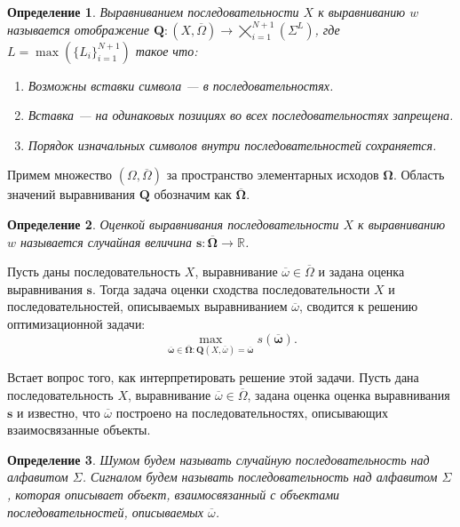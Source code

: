 \documentclass[specialist,
substylefile = spbu_report.rtx,
subf,href,colorlinks=true, 12pt]{disser}
\newtheorem{defenition}{Определение}
\begin{document}
		\begin{defenition}
			Выравниванием последовательности $X$ к выравниванию $w$ называется отображение $\boldsymbol{Q}: (X, \overline{\Omega}) \rightarrow \bigtimes_{i=1}^{N+1}(\Sigma^{L})$, где $L = \max(\{L_i\}_{i=1}^{N+1})$ такое что:
			\begin{enumerate}
				\item Возможны вставки символа --- в последовательностях.
				\item Вставка --- на одинаковых позициях во всех последовательностях запрещена.
				\item Порядок изначальных символов внутри последовательностей сохраняется.
			\end{enumerate}
		\end{defenition}
		
		Примем множество $(\Omega, \overline \Omega)$ за пространство элементарных исходов $\boldsymbol{\Omega}$. Область значений выравнивания $\boldsymbol Q$ обозначим как $\overline{\boldsymbol{\Omega}}$.
		
		\begin{defenition}				
			Оценкой выравнивания последовательности $X$ к выравниванию $w$ называется случайная величина $\boldsymbol s:\overline{\boldsymbol{\Omega}} \rightarrow \mathbb{R}$.
		\end{defenition}
	
		Пусть даны последовательность $X$, выравнивание $\overline{\omega} \in \overline{\Omega}$ и задана оценка выравнивания $\boldsymbol{s}$. Тогда задача оценки сходства последовательности $X$ и последовательностей, описываемых выравниванием $\overline{\omega}$, сводится к решению оптимизационной задачи:		
		\begin{equation*}
			\max_{\overline{\boldsymbol{\omega}} \in \overline{\boldsymbol{\Omega}} : \boldsymbol{Q}(X, \overline{\omega}) = \overline{\boldsymbol{\omega}}}s(\overline{\boldsymbol{\omega}}).
		\end{equation*}	
	
		Встает вопрос того, как интерпретировать решение этой задачи. Пусть дана последовательность $X$, выравнивание $\overline{\omega} \in \overline{\Omega}$, задана оценка оценка выравнивания $\boldsymbol{s}$ и известно, что $\overline{\omega}$ построено на последовательностях, описывающих взаимосвязанные объекты.
		\begin{defenition}
			Шумом будем называть случайную последовательность над алфавитом $\Sigma$. Сигналом будем называть последовательность над алфавитом $\Sigma$, которая описывает объект, взаимосвязанный с объектами последовательностей, описываемых $\overline{\omega}$.
		\end{defenition}
		
\end{document}
